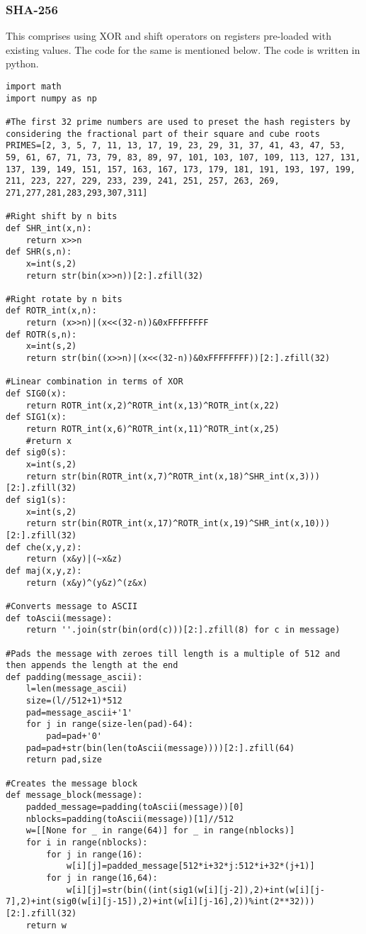 \subsubsection*{SHA-256}
This comprises using XOR and shift operators on registers pre-loaded with existing values. The code for the same is mentioned below. The code is written in python.
\begin{lstlisting}
import math
import numpy as np

#The first 32 prime numbers are used to preset the hash registers by considering the fractional part of their square and cube roots
PRIMES=[2, 3, 5, 7, 11, 13, 17, 19, 23, 29, 31, 37, 41, 43, 47, 53, 59, 61, 67, 71, 73, 79, 83, 89, 97, 101, 103, 107, 109, 113, 127, 131, 137, 139, 149, 151, 157, 163, 167, 173, 179, 181, 191, 193, 197, 199, 211, 223, 227, 229, 233, 239, 241, 251, 257, 263, 269, 271,277,281,283,293,307,311]

#Right shift by n bits
def SHR_int(x,n):
    return x>>n
def SHR(s,n):
    x=int(s,2)
    return str(bin(x>>n))[2:].zfill(32)

#Right rotate by n bits
def ROTR_int(x,n):
    return (x>>n)|(x<<(32-n))&0xFFFFFFFF
def ROTR(s,n):
    x=int(s,2)
    return str(bin((x>>n)|(x<<(32-n))&0xFFFFFFFF))[2:].zfill(32)

#Linear combination in terms of XOR
def SIG0(x):
    return ROTR_int(x,2)^ROTR_int(x,13)^ROTR_int(x,22)
def SIG1(x):
    return ROTR_int(x,6)^ROTR_int(x,11)^ROTR_int(x,25)
    #return x
def sig0(s):
    x=int(s,2)
    return str(bin(ROTR_int(x,7)^ROTR_int(x,18)^SHR_int(x,3)))[2:].zfill(32)
def sig1(s):
    x=int(s,2)
    return str(bin(ROTR_int(x,17)^ROTR_int(x,19)^SHR_int(x,10)))[2:].zfill(32)
def che(x,y,z):
    return (x&y)|(~x&z)
def maj(x,y,z):
    return (x&y)^(y&z)^(z&x)

#Converts message to ASCII
def toAscii(message):
    return ''.join(str(bin(ord(c)))[2:].zfill(8) for c in message)

#Pads the message with zeroes till length is a multiple of 512 and then appends the length at the end
def padding(message_ascii):
    l=len(message_ascii)
    size=(l//512+1)*512
    pad=message_ascii+'1'
    for j in range(size-len(pad)-64):
        pad=pad+'0'
    pad=pad+str(bin(len(toAscii(message))))[2:].zfill(64)
    return pad,size

#Creates the message block
def message_block(message):
    padded_message=padding(toAscii(message))[0]
    nblocks=padding(toAscii(message))[1]//512
    w=[[None for _ in range(64)] for _ in range(nblocks)]
    for i in range(nblocks):
        for j in range(16):
            w[i][j]=padded_message[512*i+32*j:512*i+32*(j+1)]
        for j in range(16,64):
            w[i][j]=str(bin((int(sig1(w[i][j-2]),2)+int(w[i][j-7],2)+int(sig0(w[i][j-15]),2)+int(w[i][j-16],2))%int(2**32)))[2:].zfill(32)
    return w


\end{lstlisting}

